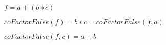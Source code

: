 \documentclass{article}
\begin{document}
$f = a +
(b ∗ c)$
\pagebreak

$coFactorFalse(f) = b ∗c =
coFactorFalse(f, a)$
\pagebreak

$coFactorFalse(f, c) = a + b$
\pagebreak
\end{document}
